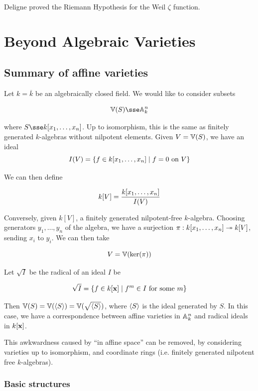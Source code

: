 \documentclass{article}
\begin{document}
Deligne proved the Riemann Hypothesis for the Weil \(\zeta\) function.

\section{Beyond Algebraic Varieties}

\subsection{Summary of affine varieties}

Let \(k = \overline k\) be an algebraically closed field. We would like to consider subsets

\[\van(S) \sse \aff k n\]

where \(S \sse k\poly n\). Up to isomorphism, this is the same as finitely generated \(k\)-algebras without nilpotent elements. Given \(V = \mathbb{V}(S)\), we have an ideal \[I(V) = \left\{f \in k[x_1, \dots, x_{n}] \mid f = 0 \text{ on }V\right\}\]

We can then define

\[k[V] = \frac{k[x_1, \dots, x_{n}]}{I(V)}\]

Conversely, given \(k[V]\), a finitely generated nilpotent-free \(k\)-algebra. Choosing generators \(y_1, \dots, y_n\) of the algebra, we have a surjection \(\pi: k[x_1, \dots, x_n] \twoheadrightarrow k[V]\), sending \(x_i\) to \(y_i\). We can then take

\[V = \mathbb{V}(\ker(\pi))\]

\lec

Let \(\sqrt I\) be the radical of an ideal \(I\) be

\[\sqrt I = \left\{f \in k[\mathbf{x}] \mid f^m \in I \text{ for some }m\right\}\]

Then \(\mathbb{V}(S) = \mathbb{V}(\left\langle S \right\rangle) = \mathbb{V}(\sqrt{\left\langle S \right\rangle})\), where \(\left\langle S \right\rangle\) is the ideal generated by \(S\). In this case, we have a correspondence between affine varieties in \(\mathbb{A}_{k}^{n}\) and radical ideals in \(k[\mathbf{x}]\).

\begin{remark}
    This awkwardness caused by ``in affine space'' can be removed, by considering varieties up to isomorphism, and coordinate rings (i.e. finitely generated nilpotent free \(k\)-algebras).
\end{remark}

\subsubsection{Basic structures}
\end{document}
